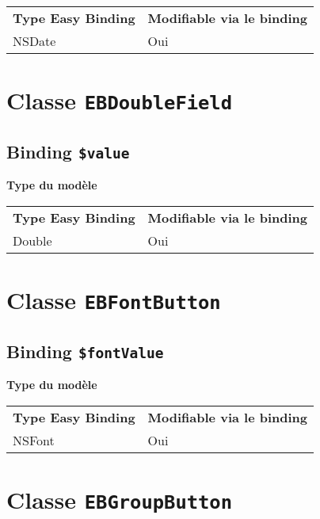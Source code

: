 \begin{tabular}{ll}
\textbf{Type Easy Binding} & \textbf{Modifiable via le binding}\\
NSDate& Oui\\
\end{tabular}







\section{Classe \texttt{EBDoubleField}}

\subsection{Binding \texttt{\$value}}

{\bf Type du modèle}

\begin{tabular}{ll}
\textbf{Type Easy Binding} & \textbf{Modifiable via le binding}\\
Double& Oui\\
\end{tabular}







\section{Classe \texttt{EBFontButton}}

\subsection{Binding \texttt{\$fontValue}}

{\bf Type du modèle}

\begin{tabular}{ll}
\textbf{Type Easy Binding} & \textbf{Modifiable via le binding}\\
NSFont& Oui\\
\end{tabular}







\section{Classe \texttt{EBGroupButton}}

